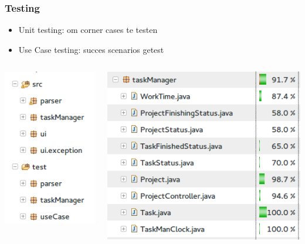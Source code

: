 \documentclass{beamer}
\begin{document}
\begin{frame}
\frametitle {Testing}
\begin{itemize}
	\item Unit testing: om corner cases te testen
	\item Use Case testing: succes scenarios getest
\end{itemize}
\begin{columns}
	\begin{column}{.4\paperwidth}
		\includegraphics[width=0.2\paperwidth]{figures/Package_overview_eclipse.png}
	\end{column}
	\begin{column}{.4\paperwidth}
		\includegraphics[width=0.35\paperwidth]{figures/coverage.png}
	\end{column}
\end{columns}
\end{frame}
\end{document}
